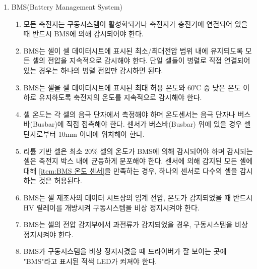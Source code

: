 \documentclass[final,a4paper,10pt]{report}
\begin{document}
\begin{enumerate}
  \item BMS(Battery Management System)
    \begin{enumerate}
      \item 모든 축전지는 구동시스템이 활성화되거나 축전지가 충전기에 연결되어 있을 때 반드시 BMS에 의해 감시되어야 한다.
      \item BMS는 셀이 셀 데이터시트에 표시된 최소/최대전압 범위 내에 유지되도록 모든 셀의 전압을 지속적으로 감시해야 한다. 단일 셀들이 병렬로 직접 연결되어 있는 경우는 하나의 병렬 전압만 감시하면 된다.
      \item BMS는 셀을 셀 데이터시트에 표시된 최대 허용 온도와 60℃ 중 낮은 온도 이하로 유지하도록 축전지의 온도를 지속적으로 감시해야 한다.
      \item 셀 온도는 각 셀의 음극 단자에서 측정해야 하며 온도센서는 음극 단자나 버스바(Busbar)에 직접 접촉해야 한다. 센서가 버스바(Busbar) 위에 있을 경우 셀 단자로부터 10mm 이내에 위치해야 한다. \label{item:BMS 온도 센서}
      \item 리튬 기반 셀은 최소 20\% 셀의 온도가 BMS에 의해 감시되어야 하며 감시되는 셀은 축전지 박스 내에 균등하게 분포해야 한다. 센서에 의해 감지된 모든 셀에 대해 \cref{item:BMS 온도 센서}을 만족하는 경우, 하나의 센서로 다수의 셀을 감시하는 것은 허용된다.
      \item BMS는 셀 제조사의 데이터 시트상의 임계 전압, 온도가 감지되었을 때 반드시 HV 릴레이를 개방시켜 구동시스템을 비상 정지시켜야 한다.
      \item BMS는 셀의 전압 감지부에서 과전류가 감지되었을 경우, 구동시스템을 비상 정지시켜야 한다.
      \item BMS가 구동시스템을 비상 정지시켰을 때 드라이버가 잘 보이는 곳에 "BMS"라고 표시된 적색 LED가 켜져야 한다.
    \end{enumerate}
\end{enumerate}
\end{document}
